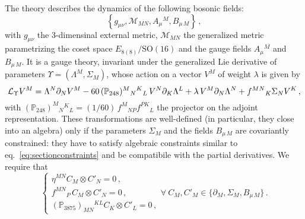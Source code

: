 \documentclass[a4paper, 11pt]{article}
\numberwithin{equation}{section}
\newcommand{\SO}[1]{\mathrm{SO}( #1 )}
\newcommand{\EE}{\ensuremath{E_{8(8)}}\xspace}
\newcommand{\+}{\oplus}
\newcommand{\M}{\ensuremath{\mathcal{M}}\xspace}
\begin{document}
The theory describes the dynamics of the following bosonic fields:
\begin{equation}
	\left\{g_{\mu\nu}, \M_{MN}, A_{\mu}{}^{M}, B_{\mu\,M}\right\}\,,
\end{equation}
with $g_{\mu\nu}$ the 3-dimensinal external metric, $\M_{MN}$ the generalized metric parametrizing the coset space $\EE/\SO{16}$ and the gauge fields $A_{\mu}{}^{M}$ and $B_{\mu\,M}$. It is a gauge theory, invariant under the generalized Lie derivative of parameters $\Upsilon=(\Lambda^{M},\Sigma_{M})$, whose action on a vector $V^{M}$ of weight $\lambda$ is given by
\begin{equation} \label{eq:genlie}
	{\cal L}_{\Upsilon} V^{M} = \Lambda^{N}\partial_{N}V^{M}-60\,(\mathbb{P}_{248})^{M}{}_{N}{}^{K}{}_{L}\,V^{N}\partial_{K}\Lambda^{L} + \lambda\, V^{M}\partial_{N}\Lambda^{N}+f^{MN}{}_{K}\Sigma_{N}V^{K}\,,
\end{equation}
with $(\mathbb{P}_{248})^{M}{}_{N}{}^{K}{}_{L}=(1/60)\,f^{M}{}_{NP}f^{PK}{}_{L}$ the projector on the adjoint representation. These transformations are well-defined (in particular, they close into an algebra) only if the parameters $\Sigma_{M}$ and the fields $B_{\mu\, M}$ are covariantly constrained: they have to satisfy algebraic constraints similar to eq.~\eqref{eq:sectionconstraints} and be compatibile with the partial derivatives. We require that
\begin{equation} \label{eq:sectionconstraint2}
	\begin{cases}
		\eta^{MN}C_{M}\otimes C'_{N} = 0\,,\\
		f^{MN}{}_{P}\,C_{M}\otimes C'_{N} = 0\,,\\
		(\mathbb{P}_{3875})_{MN}{}^{KL}C_{K}\otimes C'_{L} = 0\,,
	\end{cases}
	\forall\  C_{M}, C'_{M} \in \{\partial_{M}, \Sigma_{M}, B_{\mu\,M}\}\,.
\end{equation}
\end{document}
